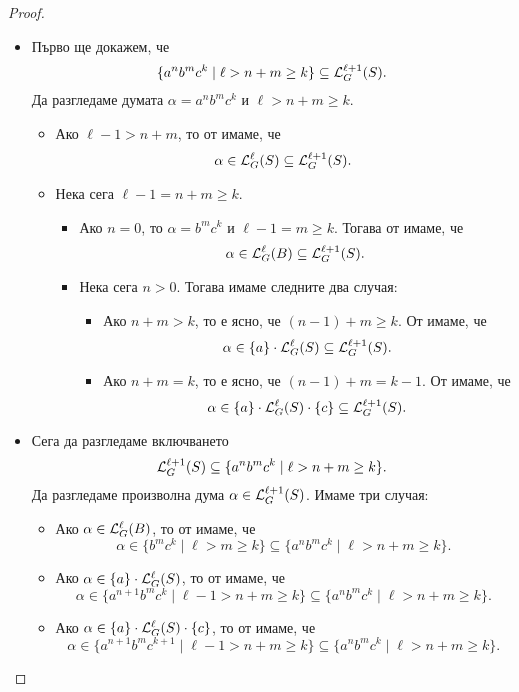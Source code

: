\begin{proof}
  \begin{itemize}
  \item
    Първо ще докажем, че
    \[\{a^nb^mc^k \mid \ell > n+m \geq k\} \subseteq \mathcal{L}^{\ell+1}_G(S).\]
    Да разгледаме думата $\alpha = a^nb^mc^k$ и $\ell > n+m \geq k$.
    \begin{itemize}
    \item
      Ако $\ell - 1 > n+m$, то от \IndHyp имаме, че
      \[\alpha \in \mathcal{L}^{\ell}_G(S) \subseteq \mathcal{L}^{\ell+1}_G(S).\]
    \item
      Нека сега $\ell-1 = n+m \geq k$.
      \begin{itemize}
      \item
        Ако $n = 0$, то $\alpha = b^mc^k$ и $\ell-1 = m \geq k$. Тогава от \IndHyp имаме, че
        \[\alpha \in \mathcal{L}^{\ell}_G(B) \subseteq \mathcal{L}^{\ell+1}_G(S).\]
      \item
        Нека сега $n > 0$. Тогава имаме следните два случая:
        \begin{itemize}
        \item 
          Ако $n + m > k$, то е ясно, че $(n-1) + m \geq k$. От \IndHyp имаме, че
          \[\alpha \in \{a\} \cdot \mathcal{L}^\ell_G(S) \subseteq \mathcal{L}^{\ell+1}_G(S).\]
        \item
          Ако $n + m = k$, то е ясно, че $(n-1) + m = k-1$. От \IndHyp имаме, че
          \[\alpha \in \{a\} \cdot \mathcal{L}^\ell_G(S) \cdot \{c\} \subseteq \mathcal{L}^{\ell+1}_G(S).\]
        \end{itemize}
      \end{itemize}
    \end{itemize}
  \item
    Сега да разгледаме включването
    \[\mathcal{L}^{\ell+1}_G(S) \subseteq \{a^nb^mc^k \mid \ell > n+m \geq k\}.\]
    Да разгледаме произволна дума $\alpha \in \mathcal{L}^{\ell+1}_G(S)$. Имаме три случая:
    \begin{itemize}
    \item
      Ако $\alpha \in \mathcal{L}^\ell_G(B)$, то от \IndHyp имаме, че
      \[\alpha \in \{b^mc^k \mid \ell > m \geq k\} \subseteq \{a^nb^mc^k \mid \ell > n+m \geq k\}.\]
    \item
      Ако $\alpha \in \{a\} \cdot \mathcal{L}^{\ell}_G(S)$, то от \IndHyp имаме, че
      \[\alpha \in \{a^{n+1}b^mc^k \mid \ell - 1 > n+m \geq k\} \subseteq \{a^nb^mc^k \mid \ell > n+m \geq k\}.\]
    \item
      Ако $\alpha \in \{a\} \cdot \mathcal{L}^{\ell}_G(S) \cdot \{c\}$, то от \IndHyp имаме, че
      \[\alpha \in \{a^{n+1}b^mc^{k+1} \mid \ell - 1 > n+m \geq k\} \subseteq \{a^nb^mc^k \mid \ell > n+m \geq k\}.\]
    \end{itemize}
  \end{itemize}


\end{proof}
